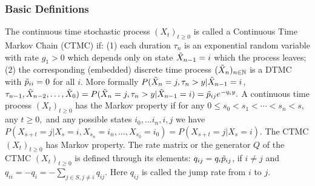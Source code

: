 \subsubsection*{Basic Definitions}
 The continuous time stochastic process $(X_t)_{t \ge 0}$ is called a Continuous Time Markov Chain (CTMC) if:
(1) each duration $\tau_n$ is an exponential random variable with rate $g_1 > 0$ which depends only on state $\Tilde{X}_{n-1} = i$ which the process leaves;
(2) the corresponding (embedded) discrete time process $(\Tilde{X}_n)_{n \in \mathbb{N}}$ is a DTMC with $\Tilde{p}_{ii} = 0$ for all $i$.
More formally $P(\Tilde{X}_n = j, \tau_n > y| \Tilde{X}_{n-1} = i$, $\tau_{n-1}, \Tilde{X}_{n-2}, \ldots, \Tilde{X}_0) = P(\Tilde{X}_n = j, \tau_n > y | \Tilde{X}_{n-1} = i) = \Tilde{p}_{ij}e^{-q_i y}.$
 A continuous time process $(X_t)_{t \ge 0}$ has the Markov property if for any $0 \le s_0 < s_1 < \cdots < s_n < s,$ any $t \ge 0,$ and any possible states $i_0, \ldots i_n, i,j$ we have $P(X_{s+t} = j | X_s = i, X_{s_n} = i_n, \ldots, X_{s_0} = i_0) = P(X_{s+t} = j | X_s = i)$.
 The CTMC $(X_t)_{t \ge 0}$ has Markov property.
 The rate matrix or the generator $Q$ of the CTMC $(X_t)_{t \ge 0}$ is defined through its elements: $q_{ij} = q_i\Tilde{p}_{ij}$, if $i \ne j$ and $q_{ii} = - q_i = - \sum_{j \in S, j \ne i} q_{ij}$. Here $q_{ij}$ is called the jump rate from $i$ to $j$.
